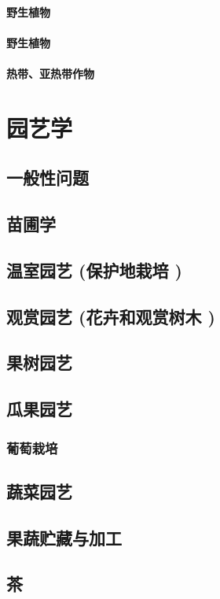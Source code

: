 \documentclass[UTF8]{../ApplicationUniverse}
\begin{document}
\subsubsection{野生植物}
\subsubsection{野生植物}
\subsubsection{热带、亚热带作物}

\chapter{园艺学}
\section{一般性问题}
\section{苗圃学}
\section{温室园艺 (保护地栽培 )}
\section{观赏园艺 (花卉和观赏树木 )}

\section{果树园艺}
\section{瓜果园艺}
   \subsection{葡萄栽培}
\section{蔬菜园艺}
\section{果蔬贮藏与加工}
\section{茶}
\end{document}

